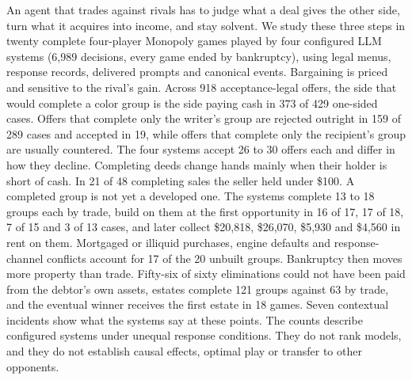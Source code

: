 An agent that trades against rivals has to judge what a deal gives the other side, turn what it acquires into income, and stay solvent. We study these three steps in twenty complete four-player Monopoly games played by four configured LLM systems (6,989 decisions, every game ended by bankruptcy), using legal menus, response records, delivered prompts and canonical events. Bargaining is priced and sensitive to the rival's gain. Across 918 acceptance-legal offers, the side that would complete a color group is the side paying cash in 373 of 429 one-sided cases. Offers that complete only the writer's group are rejected outright in 159 of 289 cases and accepted in 19, while offers that complete only the recipient's group are usually countered. The four systems accept 26 to 30 offers each and differ in how they decline. Completing deeds change hands mainly when their holder is short of cash. In 21 of 48 completing sales the seller held under \$100. A completed group is not yet a developed one. The systems complete 13 to 18 groups each by trade, build on them at the first opportunity in 16 of 17, 17 of 18, 7 of 15 and 3 of 13 cases, and later collect \$20,818, \$26,070, \$5,930 and \$4,560 in rent on them. Mortgaged or illiquid purchases, engine defaults and response-channel conflicts account for 17 of the 20 unbuilt groups. Bankruptcy then moves more property than trade. Fifty-six of sixty eliminations could not have been paid from the debtor's own assets, estates complete 121 groups against 63 by trade, and the eventual winner receives the first estate in 18 games. Seven contextual incidents show what the systems say at these points. The counts describe configured systems under unequal response conditions. They do not rank models, and they do not establish causal effects, optimal play or transfer to other opponents.
